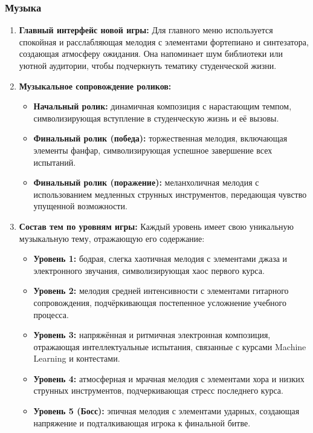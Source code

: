 \documentclass{article}
\begin{document}
\subsubsection{Музыка}
    \begin{enumerate}
    \item \textbf{Главный интерфейс новой игры:}  
    Для главного меню используется спокойная и расслабляющая мелодия с элементами фортепиано и синтезатора, создающая атмосферу ожидания. Она напоминает шум библиотеки или уютной аудитории, чтобы подчеркнуть тематику студенческой жизни.  

    \item \textbf{Музыкальное сопровождение роликов:}  
    \begin{itemize}
        \item \textbf{Начальный ролик:} динамичная композиция с нарастающим темпом, символизирующая вступление в студенческую жизнь и её вызовы.  
        \item \textbf{Финальный ролик (победа):} торжественная мелодия, включающая элементы фанфар, символизирующая успешное завершение всех испытаний.  
        \item \textbf{Финальный ролик (поражение):} меланхоличная мелодия с использованием медленных струнных инструментов, передающая чувство упущенной возможности.  
    \end{itemize}

    \item \textbf{Состав тем по уровням игры:}  
    Каждый уровень имеет свою уникальную музыкальную тему, отражающую его содержание:  
    \begin{itemize}
        \item \textbf{Уровень 1:} бодрая, слегка хаотичная мелодия с элементами джаза и электронного звучания, символизирующая хаос первого курса.  
        \item \textbf{Уровень 2:} мелодия средней интенсивности с элементами гитарного сопровождения, подчёркивающая постепенное усложнение учебного процесса.  
        \item \textbf{Уровень 3:} напряжённая и ритмичная электронная композиция, отражающая интеллектуальные испытания, связанные с курсами Machine Learning и контестами.  
        \item \textbf{Уровень 4:} атмосферная и мрачная мелодия с элементами хора и низких струнных инструментов, подчеркивающая стресс последнего курса.  
        \item \textbf{Уровень 5 (Босс):} эпичная мелодия с элементами ударных, создающая напряжение и подталкивающая игрока к финальной битве.  
    \end{itemize}


\end{enumerate}
\end{document}
